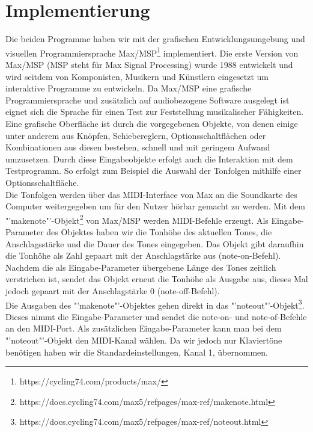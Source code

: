 \documentclass{acm_proc_article-sp}
\begin{document}
\section{Implementierung}
Die beiden Programme haben wir mit der grafischen Entwicklungsumgebung und visuellen Programmiersprache Max\slash MSP\footnote{https://cycling74.com/products/max/} implementiert. Die erste Version von Max\slash MSP (MSP steht für Max Signal Processing) \cite{wiki:max} wurde 1988 entwickelt und wird seitdem von Komponisten, Musikern und Künstlern eingesetzt um interaktive Programme zu entwickeln. Da Max\slash MSP eine grafische Programmiersprache und zusätzlich auf audiobezogene Software ausgelegt ist eignet sich die Sprache für einen Test zur Feststellung musikalischer Fähigkeiten.\\
Eine grafische Oberfläche ist durch die vorgegebenen Objekte, von denen einige unter anderem aus Knöpfen, Schiebereglern, Optionsschaltflächen oder Kombinationen aus diesen bestehen, schnell und mit geringem Aufwand umzusetzen. Durch diese Eingabeobjekte erfolgt auch die Interaktion mit dem Testprogramm. So erfolgt zum Beispiel die Auswahl der Tonfolgen mithilfe einer Optionsschaltfläche.\\
Die Tonfolgen werden über das MIDI-Interface von Max an die Soundkarte des Computer weitergegeben um für den Nutzer hörbar gemacht zu werden. Mit dem "'makenote"'-Objekt\footnote{https://docs.cycling74.com/max5/refpages/max-ref/makenote.html} von Max\slash MSP werden MIDI-Befehle erzeugt. Als Eingabe-Parameter des Objektes haben wir die Tonhöhe des aktuellen Tones, die Anschlagsstärke und die Dauer des Tones  eingegeben. Das Objekt gibt daraufhin die Tonhöhe als Zahl gepaart mit der Anschlagstärke aus (note-on-Befehl). Nachdem die als Eingabe-Parameter übergebene Länge des Tones zeitlich verstrichen ist, sendet das Objekt erneut die Tonhöhe als Ausgabe aus, dieses Mal jedoch gepaart mit der Anschlagstärke 0 (note-off-Befehl).\\
Die Ausgaben des "'makenote"'-Objektes gehen direkt in das "'noteout"'-Objekt\footnote{https://docs.cycling74.com/max5/refpages/max-ref/noteout.html}. Dieses nimmt die Eingabe-Parameter und sendet die note-on- und note-of-Befehle an den MIDI-Port. Als zusätzlichen Eingabe-Parameter kann man bei dem "'noteout"'-Objekt den MIDI-Kanal wählen. Da wir jedoch nur Klaviertöne benötigen haben wir die Standardeinstellungen, Kanal 1, übernommen.
\end{document}
